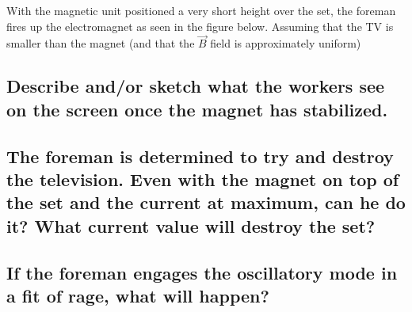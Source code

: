 \documentclass{./cls/hw}
\begin{document}
With the magnetic unit positioned a very short height over the set, the foreman
fires up the electromagnet as seen in the figure below. Assuming that the TV
is smaller than the magnet (and that the $\vec{B}$ field is approximately
uniform)

\subsection{Describe and/or sketch what the workers see on the screen once the
magnet has stabilized.}
\subsection{The foreman is determined to try and destroy the television. Even
with the magnet on top of the set and the current at maximum, can he do it?
What current value will destroy the set?}
\subsection{If the foreman engages the oscillatory mode in a fit of rage, what
will happen?}
\end{document}
